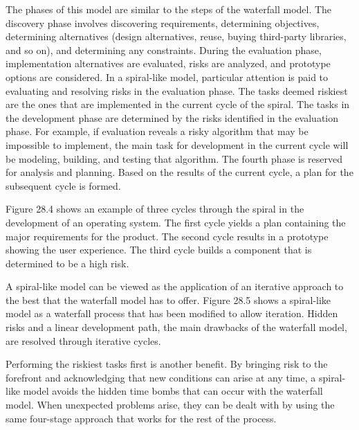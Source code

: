 The phases of this model are similar to the steps of the waterfall model. The discovery phase involves discovering requirements, determining objectives, determining alternatives (design alternatives, reuse, buying third-party libraries, and so on), and determining any constraints. During the evaluation phase, implementation alternatives are evaluated, risks are analyzed, and prototype options are considered. In a spiral-like model, particular attention is paid to evaluating and resolving risks in the evaluation phase. The tasks deemed riskiest are the ones that are implemented in the current cycle of the spiral. The tasks in the development phase are determined by the risks identified in the evaluation phase. For example, if evaluation reveals a risky algorithm that may be impossible to implement, the main task for development in the current cycle will be modeling, building, and testing that algorithm. The fourth phase is reserved for analysis and planning. Based on the results of the current cycle, a plan for the subsequent cycle is formed.


Figure 28.4 shows an example of three cycles through the spiral in the development of an operating system. The first cycle yields a plan containing the major requirements for the product. The second cycle results in a prototype showing the user experience. The third cycle builds a component that is determined to be a high risk.



A spiral-like model can be viewed as the application of an iterative approach to the best that the waterfall model has to offer. Figure 28.5 shows a spiral-like model as a waterfall process that has been modified to allow iteration. Hidden risks and a linear development path, the main drawbacks of the waterfall model, are resolved through iterative cycles.


Performing the riskiest tasks first is another benefit. By bringing risk to the forefront and acknowledging that new conditions can arise at any time, a spiral-like model avoids the hidden time bombs that can occur with the waterfall model. When unexpected problems arise, they can be dealt with by using the same four-stage approach that works for the rest of the process.

